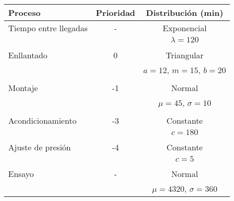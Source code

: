 \documentclass[varwidth=\maxdimen]{standalone}
\begin{document}
\begin{tabular}{ l c c }
	\toprule
	Proceso	& Prioridad	& Distribución (min)\\
	\midrule
	Tiempo entre llegadas	& -	& Exponencial \\
							&	& $\lambda=120$ \\
										 \\
	Enllantado			& 0		& Triangular \\
						&		& $a=12$, $m=15$, $b=20$ \\
										 \\
	Montaje				& -1	& Normal \\
						&		& $\mu=45$, $\sigma=10$ \\
										 \\
	Acondicionamiento	& -3	& Constante \\
						&		& $c=180$ \\
										 \\
	Ajuste de presión	& -4	& Constante  \\
						&		& $c=5$ \\
										 \\
	Ensayo				& -		& Normal \\
						&		& $\mu=4320$, $\sigma=360$ \\
	\bottomrule
\end{tabular}
\end{document}

